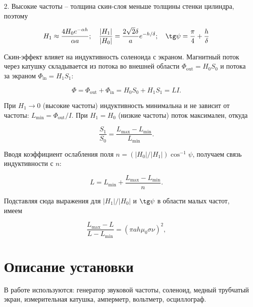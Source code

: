 \documentclass[12pt]{extarticle}
\begin{document}
	2. Высокие частоты -- толщина скин-слоя меньше толщины стенки цилиндра, поэтому 
	
	\begin{equation}
		H_1 \approx \frac{4 H_0 e^{-\alpha h}}{\alpha a}; \ \ \ \frac{|H_1|}{|H_0|} = \frac{2\sqrt{2} \delta}{a} e^{-h/\delta}; \ \ \ \tg \psi = \frac{\pi}{4} + \frac{h}{\delta}
	\end{equation}
	
	
	Скин-эффект влияет на индуктивность соленоида с экраном. Магнитный поток через катушку складывается из потока во внешней области $\Phi_{\text{out}} = H_0 S_0$ и потока за экраном $\Phi_{\text{in}} = H_1 S_1$:
	
	\begin{equation}
		\Phi = \Phi_{\text{out}} + \Phi_{\text{in}} = H_0 S_0 + H_1 S_1 = LI.
		\label{eq:flux}
	\end{equation}
	
	При $H_1 \to 0$ (высокие частоты) индуктивность минимальна и не зависит от частоты: $L_{\min} = \Phi_{\text{out}}/I$. При $H_1 = H_0$ (низкие частоты) поток максимален, откуда
	
	\begin{equation}
		\frac{S_1}{S_0} = \frac{L_{\max} - L_{\min}}{L_{\min}}.
		\label{eq:S_ratio}
	\end{equation}
	
	Вводя коэффициент ослабления поля $n = (|H_0|/|H_1|)\cos^{-1}\psi$, получаем связь индуктивности с $n$:
	
	\begin{equation}
		L = L_{\min} + \frac{L_{\max} - L_{\min}}{n}.
		\label{eq:L_n}
	\end{equation}
	
	Подставляя сюда выражения для $|H_1|/|H_0|$ и $\tg\psi$ в области малых частот, имеем
	
	\begin{equation}
		\frac{L_{\max} - L}{L - L_{\min}} = (\pi a h \mu_0 \sigma \nu)^2,
		\label{eq:L_freq}
	\end{equation}
	
	
	
\section{Описание установки}

	\hspace{4.5mm} В работе используются: генератор звуковой частоты, соленоид, медный трубчатый экран, измерительная катушка, амперметр, вольтметр, осциллограф.
	
\end{document}
